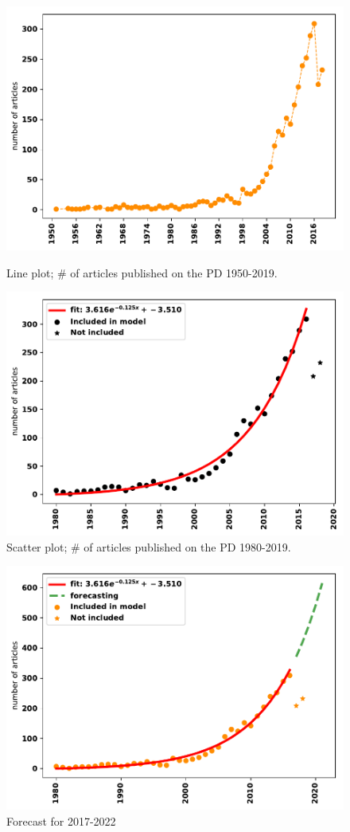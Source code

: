 \documentclass{article}
\theoremstyle{definition}
\begin{document}
\begin{figure}[!hbtp]
\begin{minipage}{.45\textwidth}
    \centering
    \includegraphics[width=.9\textwidth]{./assets/images/timeline.pdf}
    \caption{Line plot; \# of articles published on the PD 1950-2019.}\label{fig:timeseries}
\end{minipage}
\begin{minipage}{.45\textwidth}
    \centering
    \includegraphics[width=.9\textwidth]{./assets/images/fitting.pdf}
    \caption{Scatter plot; \# of articles published on the PD 1980-2019.}\label{fig:fitting}
\end{minipage}
\end{figure}

\begin{figure}[!hbtp]
    \centering
    \includegraphics[width=.5\textwidth]{./assets/images/forecasting.pdf}
    \caption{Forecast for 2017-2022}\label{fig:forecasting}
\end{figure}
\end{document}
